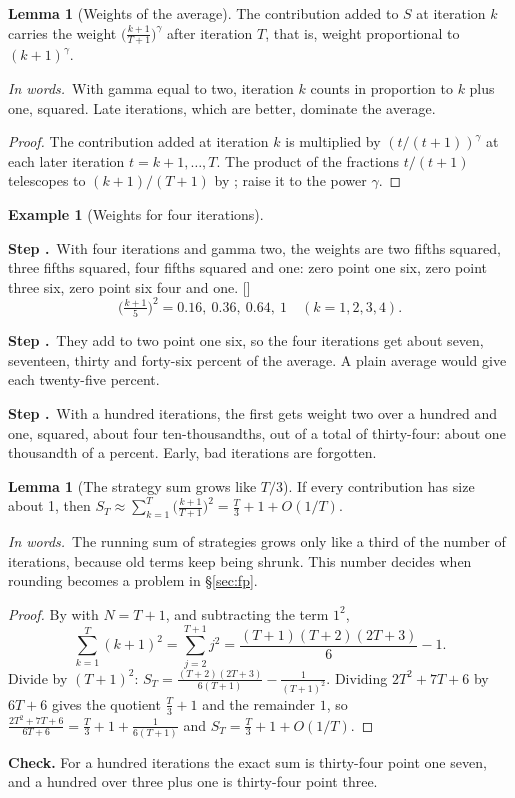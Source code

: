 \documentclass[11pt]{article}
\theoremstyle{definition}
\newtheorem{example}[definition]{Example}
\newtheorem{lemma}[definition]{Lemma}
\newcommand{\inwords}{\par\smallskip\noindent\textit{In words.}\ }
\newcounter{stp}
\newcommand{\steps}{\setcounter{stp}{0}}
\newcommand{\st}{\stepcounter{stp}\par\medskip\noindent\textbf{Step \arabic{stp}.}\ }
\newcommand{\by}[1]{\hfill{\small\color{blue!50!black}[#1]}}
\begin{document}
\begin{lemma}[Weights of the average]\label{lem:weights}
The contribution added to $S$ at iteration $k$ carries the weight $\big(\frac{k+1}{T+1}\big)^\gamma$ after iteration $T$, that is,
weight proportional to $(k+1)^\gamma$.
\inwords With gamma equal to two, iteration $k$ counts in proportion to $k$ plus one, squared. Late iterations, which are
better, dominate the average.
\end{lemma}
\begin{proof}
The contribution added at iteration $k$ is multiplied by $(t/(t+1))^\gamma$ at each later iteration $t=k+1,\dots,T$. The
product of the fractions $t/(t+1)$ telescopes to $(k+1)/(T+1)$ by ; raise it to the power $\gamma$.
\end{proof}

\begin{example}[Weights for four iterations]\label{ex:weights}
\steps
\st With four iterations and gamma two, the weights are two fifths squared, three fifths squared, four fifths squared and
one: zero point one six, zero point three six, zero point six four and one. \by{}
\[ \big(\tfrac{k+1}{5}\big)^2=0.16,\ 0.36,\ 0.64,\ 1\quad(k=1,2,3,4). \]
\st They add to two point one six, so the four iterations get about seven, seventeen, thirty and forty-six percent of the
average. A plain average would give each twenty-five percent.
\st With a hundred iterations, the first gets weight two over a hundred and one, squared, about four ten-thousandths, out
of a total of thirty-four: about one thousandth of a percent. Early, bad iterations are forgotten.
\end{example}

\begin{lemma}[The strategy sum grows like $T/3$]\label{lem:tthird}
If every contribution has size about 1, then $S_T\approx\sum_{k=1}^T\big(\frac{k+1}{T+1}\big)^2=\frac T3+1+O(1/T)$.
\inwords The running sum of strategies grows only like a third of the number of iterations, because old terms keep being
shrunk. This number decides when rounding becomes a problem in \S\ref{sec:fp}.
\end{lemma}
\begin{proof}
By  with $N=T+1$, and subtracting the term $1^2$,
\[ \sum_{k=1}^T(k+1)^2=\sum_{j=2}^{T+1}j^2=\frac{(T+1)(T+2)(2T+3)}6-1. \]
Divide by $(T+1)^2$: $S_T=\frac{(T+2)(2T+3)}{6(T+1)}-\frac1{(T+1)^2}$. Dividing $2T^2+7T+6$ by $6T+6$ gives the quotient
$\frac T3+1$ and the remainder $1$, so $\frac{2T^2+7T+6}{6T+6}=\frac T3+1+\frac1{6(T+1)}$ and $S_T=\frac T3+1+O(1/T)$.
\end{proof}
\textbf{Check.} For a hundred iterations the exact sum is thirty-four point one seven, and a hundred over three plus one is
thirty-four point three.
\end{document}

